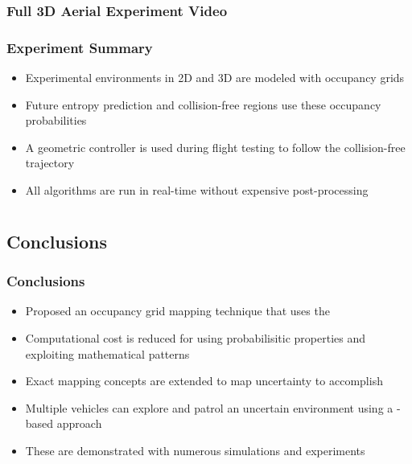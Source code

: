 \documentclass[11pt,professionalfonts,hyperref={pdftex,pdfpagemode=none,pdfstartview=FitH}]{beamer}
\renewcommand{\emph}[1]{\textit{\textbf{\color{blue}{#1}}}}
\begin{document}
\begin{frame}
\frametitle{Full 3D Aerial Experiment Video}




\end{frame}


\begin{frame}
\frametitle{Experiment Summary}
\begin{itemize}
        	\item Experimental environments in 2D and 3D are modeled with occupancy grids
	\item Future entropy prediction and collision-free regions use these occupancy probabilities
	\item A geometric controller is used during flight testing to follow the collision-free trajectory
	\item All algorithms are run in real-time without expensive post-processing 
\end{itemize}
\end{frame}

\section*{}
\subsection*{Conclusions}

\begin{frame}
\frametitle{Conclusions}
\begin{itemize}
        	\item Proposed an occupancy grid mapping technique that uses the \emph{exact probabilistic solution}
	\item Computational cost is reduced \emph{substantially} for \emph{real-time implementation} using probabilisitic properties and exploiting mathematical patterns
	\item Exact mapping concepts are extended to map uncertainty to accomplish \emph{autonomous exploration}
	\item Multiple vehicles can explore and patrol an uncertain environment using a \emph{bidding}-based approach
	\item These are demonstrated with numerous simulations and experiments
\end{itemize}
\end{frame}
\end{document}
